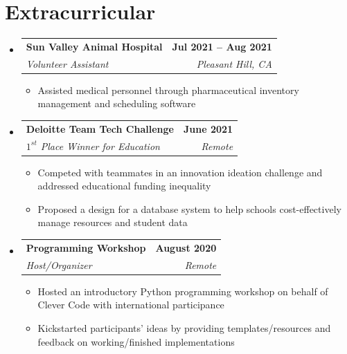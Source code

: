 \documentclass[letterpaper,11pt]{article}
\makeatletter
\newcommand{\resumeItem}[1]{
  \item\small{
    {#1 \vspace{-2pt}}
  }
}
\newcommand{\resumeSubheading}[4]{
  \vspace{-2pt}\item
    \begin{tabular*}{1.0\textwidth}[t]{l@{\extracolsep{\fill}}r}
      \textbf{#1} & \textbf{\small #2} \\
      \textit{\small#3} & \textit{\small #4} \\
    \end{tabular*}\vspace{-7pt}
}
\newcommand{\resumeSubHeadingListStart}{\begin{itemize}[leftmargin=0.0in, label={}]}
\newcommand{\resumeSubHeadingListEnd}{\end{itemize}}
\newcommand{\resumeItemListStart}{\begin{itemize}}
\newcommand{\resumeItemListEnd}{\end{itemize}\vspace{-5pt}}
\makeatother
\begin{document}
\section{Extracurricular}
\resumeSubHeadingListStart
\resumeSubheading{Sun Valley Animal Hospital}{Jul 2021 -- Aug 2021}{Volunteer Assistant}{Pleasant Hill, CA}
\resumeItemListStart
\resumeItem{Assisted medical personnel through pharmaceutical inventory management and scheduling software}
\resumeItemListEnd
\resumeSubheading{Deloitte Team Tech Challenge}{June 2021}{$1^{st}$ Place Winner for Education}{Remote}
\resumeItemListStart
\resumeItem{Competed with teammates in an innovation ideation challenge and addressed educational funding inequality}
\resumeItem{Proposed a design for a database system to help schools cost-effectively manage resources and student data}
\resumeItemListEnd
\resumeSubheading{Programming Workshop}{August 2020}{Host/Organizer}{Remote}
\resumeItemListStart
\resumeItem{Hosted an introductory Python programming workshop on behalf of Clever Code with international participance}
\resumeItem{Kickstarted participants' ideas by providing templates/resources and feedback on working/finished implementations}
\resumeItemListEnd
\resumeSubHeadingListEnd
\vspace{-10pt}
\end{document}
